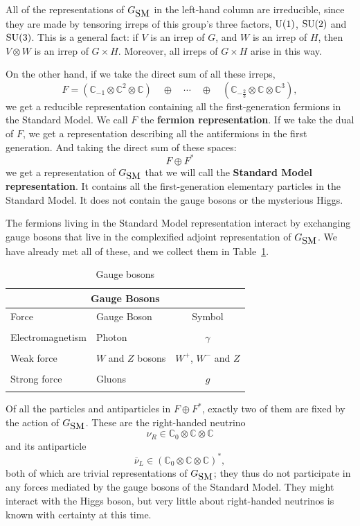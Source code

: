 \documentclass[12pt]{article}
\newcommand{\C}{{\mathbb C}}  %
\newcommand{\U}{{\rm U}}    %
\newcommand{\SU}{{\rm SU}}    %
\newcommand{\twothirds}{\frac{2}{3}} %
\newcommand{\GSM}{{G_{\mbox{\rm SM}}}}  %
\newcommand{\nubar}{\overline{\nu}} %
\begin{document}
\noindent
All of the representations of $\GSM$ in the left-hand column are irreducible,
since they are made by tensoring irreps of this group's three factors,
$\U(1)$, $\SU(2)$ and $\SU(3)$.  This is a general
fact: if $V$ is an irrep of $G$, and $W$ is an irrep of $H$, then $V \otimes W$
is an irrep of $G \times H$. Moreover, all irreps of $G \times H$ arise in this
way.

On the other hand, if we take the direct sum of all these irreps,
\[ F = (\C_{-1} \otimes \C^2 \otimes \C) \quad \oplus \quad \cdots \quad 
\oplus \quad (\C_{-\twothirds} \otimes \C \otimes \C^3), \]
we get a reducible representation containing all the first-generation fermions
in the Standard Model.  We call $F$ the {\bf fermion representation}.
If we take the dual of $F$, we get a representation describing all the 
antifermions in the first generation.  And taking the direct sum of these
spaces:
\[ F \oplus F^* \]
we get a representation of $\GSM$ that we will call the \textbf{Standard Model
representation}. It contains all the first-generation elementary particles in
the Standard Model. It does not contain the gauge bosons or the mysterious
Higgs. 

The fermions living in the Standard Model representation interact by exchanging
gauge bosons that live in the complexified adjoint representation of $\GSM$. We
have already met all of these, and we collect them in
Table~\ref{tab:gaugebosons}.

\begin{table}[H]
\begin{center}
	\begin{tabular}{llc}
		\hline
		\multicolumn{3}{|c|}{\bf{Gauge Bosons}} \\
		\hline
		Force & Gauge Boson & Symbol \\
		\hline
                \\ 
		Electromagnetism & Photon & $\gamma$ \\
		\\
		Weak force & $W$ and $Z$ bosons & $W^+$, $W^-$ and $Z$ \\
		\\
		Strong force & Gluons & $g$ \\  \\
		\hline 
	\end{tabular}
	\caption{Gauge bosons} \label{tab:gaugebosons}
\end{center}
\end{table}

Of all the particles and antiparticles in $F \oplus F^*$, exactly two of
them are fixed by the action of $\GSM$. These are the right-handed neutrino
\[ \nu_R \in \C_0 \otimes \C \otimes \C \]
and its antiparticle
\[ \nubar_L \in (\C_0 \otimes \C \otimes \C)^*, \]
both of which are trivial representations of $\GSM$; they thus do not
participate in any forces mediated by the gauge bosons of the Standard
Model. They might interact with the Higgs boson, but very little about
right-handed neutrinos is known with certainty at this time.
\end{document}

